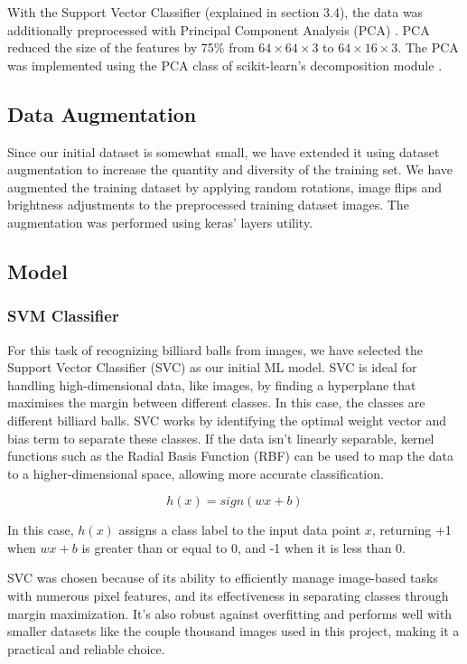 \documentclass{article}
\begin{document}
With the Support Vector Classifier (explained in section 3.4), the data was additionally preprocessed with Principal Component Analysis (PCA) \cite{woldPrincipalComponentAnalysis}. PCA reduced the size of the features by 75\% from $64\times64\times3$ to $64\times16\times3$. The PCA was implemented using the PCA class of scikit-learn’s decomposition module \cite{PCA}.

\subsection{Data Augmentation}
\label{sec:data_augmentation}
Since our initial dataset is somewhat small, we have extended it using dataset augmentation to increase the quantity and diversity of the training set. We have augmented the training dataset by applying random rotations, image flips and brightness adjustments to the preprocessed training dataset images. The augmentation was performed using keras' layers utility.

\subsection{Model} %
\label{sec:model}
\subsubsection*{SVM Classifier}
\label{sec:svm_classifier}
For this task of recognizing billiard balls from images, we have selected the Support Vector Classifier (SVC) as our initial ML model. SVC is ideal for handling high-dimensional data, like images, by finding a hyperplane that maximises the margin between different classes. In this case, the classes are different billiard balls. SVC works by identifying the optimal weight vector and bias term to separate these classes. If the data isn't linearly separable, kernel functions such as the Radial Basis Function (RBF) can be used to map the data to a higher-dimensional space, allowing more accurate classification. \cite{unknownMachineLearningApproach2023, nobleWhatSupportVector2006}

\begin{equation}
    h(x)=sign(wx+b)
\end{equation}

In this case, $h(x)$ assigns a class label  to the input data point $x$, returning +1 when $wx+b$ is greater than or equal to 0, and -1 when it is less than 0.

SVC was chosen because of its ability to efficiently manage image-based tasks with numerous pixel features, and its effectiveness in separating classes through margin maximization. It's also robust against overfitting and performs well with smaller datasets like the couple thousand images used in this project, making it a practical and reliable choice. \cite{unknownMachineLearningApproach2023,nobleWhatSupportVector2006}
\end{document}
